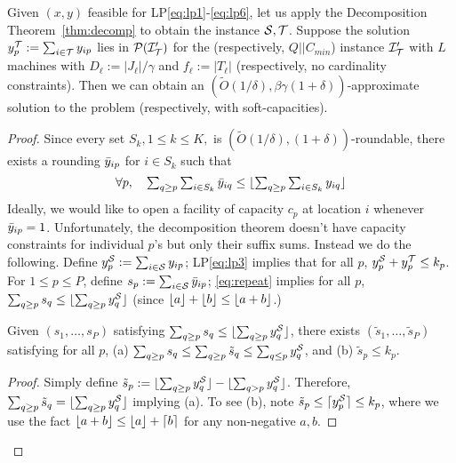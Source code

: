 \begin{lemma}
	Given $(x,y)$ feasible for  LP\eqref{eq:lp1}-\eqref{eq:lp6}, let us apply the Decomposition Theorem~\ref{thm:decomp} to obtain the instance ${\cal S},{\cal T}$.
	Suppose the solution $y^{\cal T}_p := \sum_{i\in{\cal T}} y_{ip}$ lies in ${\cal P}({\cal I}'_{\cal T})$ for the \cckp (respectively, $Q||C_{min}$) instance ${\cal I}'_{\cal T}$ with $L$ machines with $D_\ell := |J_\ell|/\gamma$
	and $f_\ell := |T_\ell|$ (respectively, no cardinality constraints). Then we can obtain an $(\tilde{O}(1/\delta), \beta\gamma(1+\delta))$-approximate solution to the \mckc problem (respectively, with soft-capacities).
\end{lemma}
\begin{proof}
Since every set $S_k, 1\leq k\leq K,$ is $(\tilde{O}(1/\delta),(1+\delta))$-roundable, there exists a rounding $\bar{y}_{ip}$ for $i\in S_k$  such that
\begin{equation}\label{eq:repeat}
\textstyle \forall p, ~~~ \sum_{q\geq p} \sum_{i\in S_k} \bar{y}_{iq} \leq \lfloor\sum_{q\geq p} \sum_{i\in S_k} y_{iq}\rfloor
\end{equation}
\def\s{\tilde{s}}
Ideally, we would like to open a facility of capacity $c_p$ at location $i$ whenever $\bar{y}_{ip} = 1$. Unfortunately, the decomposition theorem doesn't have capacity constraints for individual $p$'s but only their suffix sums. Instead we do the following. Define $y^{{\cal S}}_p := \sum_{i\in {\cal S}} y_{ip}$; LP\eqref{eq:lp3} implies that for all $p$, $y^{\cal S}_p + y^{\cal T}_p \leq k_p$.
For $1\leq p\leq P$, define $s_p := \sum_{i\in {\cal S}} \bar{y}_{ip}$; \eqref{eq:repeat} implies for all $p$, $\sum_{q\geq p} s_q \leq \lfloor\sum_{q\geq p} y^{\cal S}_q\rfloor$ (since $\lfloor a\rfloor + \lfloor b\rfloor \leq \lfloor a+b\rfloor$.)
\begin{claim}\label{clm:massmovement}
	Given $(s_1,\ldots,s_P)$ satisfying $\sum_{q\geq p} s_q \leq \lfloor\sum_{q\geq p} y^{\cal S}_q\rfloor$, there exists $(\s_1,\ldots,\s_P)$ satisfying
	for all $p$, (a) $\sum_{q\geq p} s_q \leq \sum_{q\geq p} \s_q \leq \sum_{q\leq p} y^\calS_q$, and (b) $\s_p \leq k_p$.
\end{claim}
\begin{proof}
Simply define $\s_p := \floor{\sum_{q\geq p} y^\calS_q} - \floor{\sum_{q> p} y^\calS_q}$. Therefore, $\sum_{q\geq p} \s_q = \floor{\sum_{q\geq p} y^\calS_q}$ implying (a).
To see (b), note $\s_p \leq \ceil{y^\calS_p} \leq k_p$, where we use the fact $\lfloor a+b\rfloor \leq \lfloor a\rfloor + \lceil b\rceil$ for any non-negative $a,b$.
\end{proof}


\end{proof}
